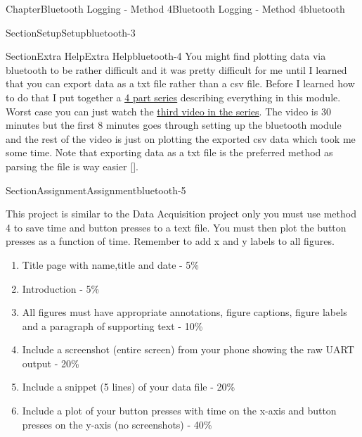 \documentclass[oneside,10pt,]{book}
\newcommand{\xreffont}{\relax}
\newcommand{\linkhilite}[1]{\underline{#1}}
\numberwithin{equation}{section}
\begin{document}
\begin{chapterptx}{Chapter}{Bluetooth Logging - Method 4}{}{Bluetooth Logging - Method 4}{}{}{bluetooth}
\begin{sectionptx}{Section}{Setup}{}{Setup}{}{}{bluetooth-3}
\end{sectionptx}
%
%
\typeout{************************************************}
\typeout{************************************************}
%
\begin{sectionptx}{Section}{Extra Help}{}{Extra Help}{}{}{bluetooth-4}
You might find plotting data via bluetooth to be rather difficult and it was pretty difficult for me until I learned that you can export data as a txt file rather than a csv file. Before I learned how to do that I put together a \href{https://www.youtube.com/playlist?list=PL_D7_GvGz-v0-U3JACRMgldvqQqn2mje9}{\linkhilite{4 part series}} describing everything in this module. Worst case you can just watch the \href{https://www.youtube.com/watch?v=9EHNFdVX9O8\&list=PL_D7_GvGz-v0-U3JACRMgldvqQqn2mje9\&index=3}{\linkhilite{third video in the series}}. The video is 30 minutes but the first 8 minutes goes through setting up the bluetooth module and the rest of the video is just on plotting the exported csv data which took me some time. Note that exporting data as a txt file is the preferred method as parsing the file is way easier \hyperlink{youtube}{\linkhilite{[{\xreffont 50}]}}.%
\end{sectionptx}
%
%
\typeout{************************************************}
\typeout{************************************************}
%
\begin{sectionptx}{Section}{Assignment}{}{Assignment}{}{}{bluetooth-5}
\begin{introduction}{}%
This project is similar to the Data Acquisition project only you must use method 4 to save time and button presses to a text file. You must then plot the button presses as a function of time. Remember to add x and y labels to all figures.%
%
\begin{enumerate}
\item{}Title page with name,title and date - 5\%%
\item{}Introduction - 5\%%
\item{}All figures must have appropriate annotations, figure captions, figure labels and a paragraph of supporting text - 10\%%
\item{}Include a screenshot (entire screen) from your phone showing the raw UART output - 20\%%
\item{}Include a snippet (5 lines) of your data file - 20\%%
\item{}Include a plot of your button presses with time on the x-axis and button presses on the y-axis (no screenshots) - 40\%%

\end{enumerate}
\end{introduction}
\end{sectionptx}
\end{chapterptx}
\end{document}
